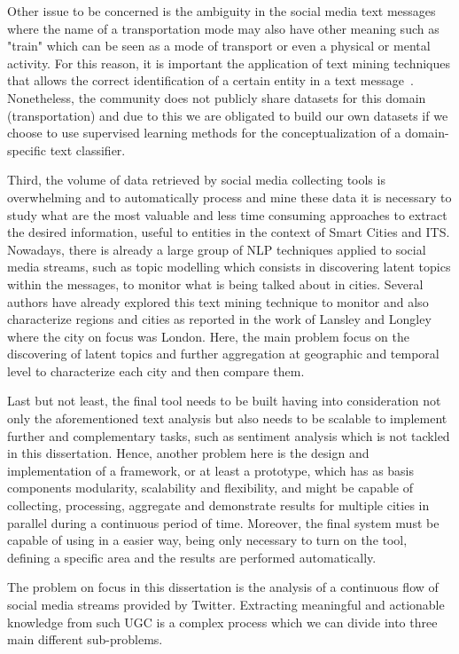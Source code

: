 Other issue to be concerned is the ambiguity in the social media text messages where the name of a transportation mode may also have other meaning such as "train" which can be seen as a mode of transport or even a physical or mental activity. For this reason, it is important the application of text mining techniques that allows the correct identification of a certain entity in a text message~\cite{saleiro2013popstar}. Nonetheless, the community does not publicly share datasets for this domain (transportation) and due to this we are obligated to build our own datasets if we choose to use supervised learning methods for the conceptualization of a domain-specific text classifier.

Third, the volume of data retrieved by social media collecting tools is overwhelming and to automatically process and mine these data it is necessary to study what are the most valuable and less time consuming approaches to extract the desired information, useful to entities in the context of Smart Cities and \gls{ITS}. Nowadays, there is already a large group of \gls{NLP} techniques applied to social media streams, such as topic modelling which consists in discovering latent topics within the messages, to monitor what is being talked about in cities. Several authors have already explored this text mining technique to monitor and also characterize regions and cities as reported in the work of Lansley and Longley~\cite{lansley2016geography} where the city on focus was London. Here, the main problem focus on the discovering of latent topics and further aggregation at geographic and temporal level to characterize each city and then compare them. 

Last but not least, the final tool needs to be built having into consideration not only the aforementioned text analysis but also needs to be scalable to implement further and complementary tasks, such as sentiment analysis which is not tackled in this dissertation. Hence, another problem here is the design and implementation of a framework, or at least a prototype, which has as basis components modularity, scalability and flexibility, and might be capable of collecting, processing, aggregate and demonstrate results for multiple cities in parallel during a continuous period of time. Moreover, the final system must be capable of using in a easier way, being only necessary to turn on the tool, defining a specific area and the results are performed automatically.

\iffalse
The problem on focus in this dissertation is the analysis of a continuous flow of social media streams provided by Twitter. Extracting meaningful and actionable knowledge from such \gls{UGC} is a complex process which we can divide into three main different sub-problems.


